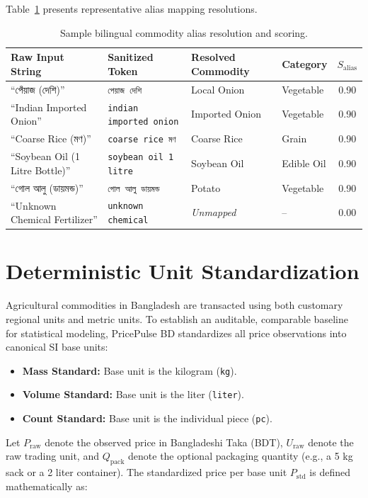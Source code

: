 Table~\ref{tab:alias_sample} presents representative alias mapping resolutions.

\begin{table}[htbp]
\centering
\small
\caption{Sample bilingual commodity alias resolution and scoring.}
\label{tab:alias_sample}
\begin{tabular}{@{}llllc@{}}
\toprule
\textbf{Raw Input String} & \textbf{Sanitized Token} & \textbf{Resolved Commodity} & \textbf{Category} & $S_{\text{alias}}$ \\
\midrule
``পেঁয়াজ (দেশি)'' & \texttt{পেয়াজ দেশি} & Local Onion & Vegetable & 0.90 \\
``Indian Imported Onion'' & \texttt{indian imported onion} & Imported Onion & Vegetable & 0.90 \\
``Coarse Rice (মণ)'' & \texttt{coarse rice মণ} & Coarse Rice & Grain & 0.90 \\
``Soybean Oil (1 Litre Bottle)'' & \texttt{soybean oil 1 litre} & Soybean Oil & Edible Oil & 0.90 \\
``গোল আলু (ডায়মন্ড)'' & \texttt{গোল আলু ডায়মন্ড} & Potato & Vegetable & 0.90 \\
``Unknown Chemical Fertilizer'' & \texttt{unknown chemical} & \textit{Unmapped} & -- & 0.00 \\
\bottomrule
\end{tabular}
\end{table}

\section{Deterministic Unit Standardization}
Agricultural commodities in Bangladesh are transacted using both customary regional units and metric units. To establish an auditable, comparable baseline for statistical modeling, PricePulse BD standardizes all price observations into canonical SI base units:
\begin{itemize}
    \item \textbf{Mass Standard:} Base unit is the kilogram (\texttt{kg}).
    \item \textbf{Volume Standard:} Base unit is the liter (\texttt{liter}).
    \item \textbf{Count Standard:} Base unit is the individual piece (\texttt{pc}).
\end{itemize}

Let $P_{\text{raw}}$ denote the observed price in Bangladeshi Taka (BDT), $U_{\text{raw}}$ denote the raw trading unit, and $Q_{\text{pack}}$ denote the optional packaging quantity (e.g., a 5 kg sack or a 2 liter container). The standardized price per base unit $P_{\text{std}}$ is defined mathematically as:

